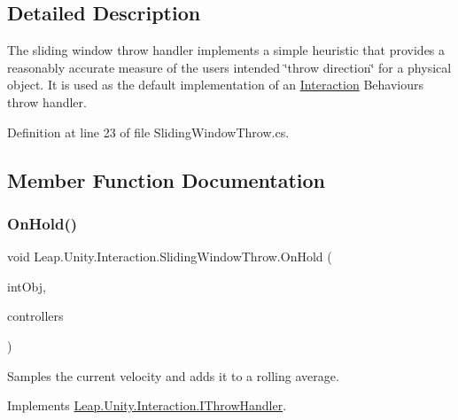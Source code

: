 \subsection{Detailed Description}
The sliding window throw handler implements a simple heuristic that provides a reasonably accurate measure of the user\textquotesingle{}s intended \char`\"{}throw direction\char`\"{} for a physical object. It is used as the default implementation of an \mbox{\hyperlink{namespace_leap_1_1_unity_1_1_interaction}{Interaction}} Behaviour\textquotesingle{}s throw handler. 



Definition at line 23 of file Sliding\+Window\+Throw.\+cs.



\subsection{Member Function Documentation}
\mbox{\label{class_leap_1_1_unity_1_1_interaction_1_1_sliding_window_throw_ae0b88c5531628875477b51d107ba1c11}} 
\subsubsection{\texorpdfstring{OnHold()}{OnHold()}}
{\footnotesize\ttfamily void Leap.\+Unity.\+Interaction.\+Sliding\+Window\+Throw.\+On\+Hold (\begin{DoxyParamCaption}\item[{\mbox{\hyperlink{class_leap_1_1_unity_1_1_interaction_1_1_interaction_behaviour}{Interaction\+Behaviour}}}]{int\+Obj,  }\item[{\mbox{\hyperlink{struct_leap_1_1_unity_1_1_readonly_list}{Readonly\+List}}$<$ \mbox{\hyperlink{class_leap_1_1_unity_1_1_interaction_1_1_interaction_controller}{Interaction\+Controller}} $>$}]{controllers }\end{DoxyParamCaption})}



Samples the current velocity and adds it to a rolling average. 



Implements \mbox{\hyperlink{interface_leap_1_1_unity_1_1_interaction_1_1_i_throw_handler_a416c8f5dc270ba95034487124b502079}{Leap.\+Unity.\+Interaction.\+I\+Throw\+Handler}}.



